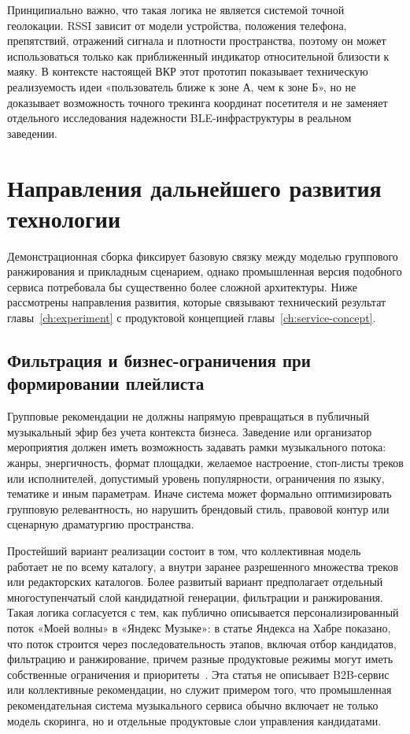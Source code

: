 Принципиально важно, что такая логика не является системой точной геолокации. RSSI зависит от модели устройства, положения телефона, препятствий, отражений сигнала и плотности пространства, поэтому он может использоваться только как приближенный индикатор относительной близости к маяку. В контексте настоящей ВКР этот прототип показывает техническую реализуемость идеи «пользователь ближе к зоне А, чем к зоне Б», но не доказывает возможность точного трекинга координат посетителя и не заменяет отдельного исследования надежности BLE-инфраструктуры в реальном заведении.

\section{Направления дальнейшего развития технологии}
\label{sec:ch6:future}

Демонстрационная сборка фиксирует базовую связку между моделью группового ранжирования и прикладным сценарием, однако промышленная версия подобного сервиса потребовала бы существенно более сложной архитектуры. Ниже рассмотрены направления развития, которые связывают технический результат главы~\ref{ch:experiment} с продуктовой концепцией главы~\ref{ch:service-concept}.

\subsection{Фильтрация и бизнес-ограничения при формировании плейлиста}
\label{subsec:ch6:business-filters}

Групповые рекомендации не должны напрямую превращаться в публичный музыкальный эфир без учета контекста бизнеса. Заведение или организатор мероприятия должен иметь возможность задавать рамки музыкального потока: жанры, энергичность, формат площадки, желаемое настроение, стоп-листы треков или исполнителей, допустимый уровень популярности, ограничения по языку, тематике и иным параметрам. Иначе система может формально оптимизировать групповую релевантность, но нарушить брендовый стиль, правовой контур или сценарную драматургию пространства.

Простейший вариант реализации состоит в том, что коллективная модель работает не по всему каталогу, а внутри заранее разрешенного множества треков или редакторских каталогов. Более развитый вариант предполагает отдельный многоступенчатый слой кандидатной генерации, фильтрации и ранжирования. Такая логика согласуется с тем, как публично описывается персонализированный поток «Моей волны» в «Яндекс Музыке»: в статье Яндекса на Хабре показано, что поток строится через последовательность этапов, включая отбор кандидатов, фильтрацию и ранжирование, причем разные продуктовые режимы могут иметь собственные ограничения и приоритеты~\cite{stepurin2024unknown_my_wave}. Эта статья не описывает B2B-сервис или коллективные рекомендации, но служит примером того, что промышленная рекомендательная система музыкального сервиса обычно включает не только модель скоринга, но и отдельные продуктовые слои управления кандидатами.

